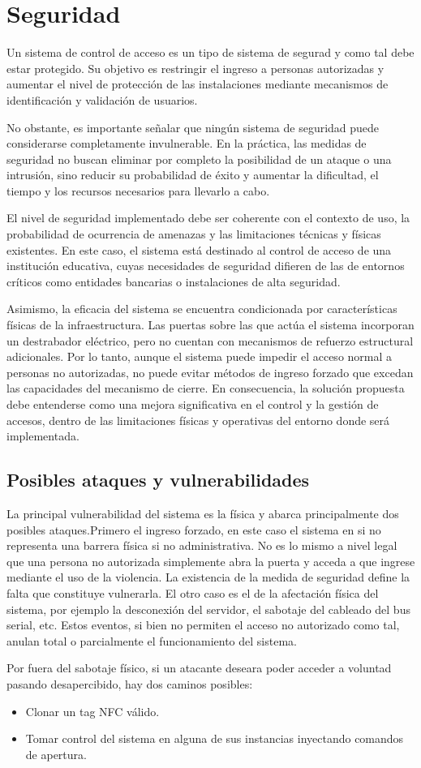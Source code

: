 \section{Seguridad} 

Un sistema de control de acceso es un tipo de sistema de segurad y como tal debe estar protegido.
Su objetivo es restringir el ingreso a personas autorizadas y aumentar el nivel de protección de las instalaciones mediante mecanismos de identificación y validación de usuarios.

No obstante, es importante señalar que ningún sistema de seguridad puede considerarse completamente invulnerable. En la práctica, las medidas de seguridad no buscan eliminar por completo la posibilidad de un ataque o una intrusión, sino reducir su probabilidad de éxito y aumentar la dificultad, el tiempo y los recursos necesarios para llevarlo a cabo.

El nivel de seguridad implementado debe ser coherente con el contexto de uso, la probabilidad de ocurrencia de amenazas y las limitaciones técnicas y físicas existentes. En este caso, el sistema está destinado al control de acceso de una institución educativa, cuyas necesidades de seguridad difieren de las de entornos críticos como entidades bancarias o instalaciones de alta seguridad.

Asimismo, la eficacia del sistema se encuentra condicionada por características físicas de la infraestructura. Las puertas sobre las que actúa el sistema incorporan un destrabador eléctrico, pero no cuentan con mecanismos de refuerzo estructural adicionales. Por lo tanto, aunque el sistema puede impedir el acceso normal a personas no autorizadas, no puede evitar métodos de ingreso forzado que excedan las capacidades del mecanismo de cierre. En consecuencia, la solución propuesta debe entenderse como una mejora significativa en el control y la gestión de accesos, dentro de las limitaciones físicas y operativas del entorno donde será implementada.

\subsection{Posibles ataques y vulnerabilidades}

La principal vulnerabilidad del sistema es la física y abarca principalmente dos posibles ataques.Primero el ingreso forzado, en este caso el sistema en si no representa una barrera física si no administrativa. No es lo mismo a nivel legal que una persona no autorizada simplemente abra la puerta y acceda a que ingrese mediante el uso de la violencia. La existencia de la medida de seguridad define la falta que constituye vulnerarla.
El otro caso es el de la afectación física del sistema, por ejemplo la desconexión del servidor, el sabotaje del cableado del bus serial, etc. Estos eventos, si bien no permiten el acceso no autorizado como tal, anulan total o parcialmente el funcionamiento del sistema.

Por fuera del sabotaje físico, si un atacante deseara poder acceder a voluntad pasando desapercibido, hay dos caminos posibles:

\begin{itemize}
    \item Clonar un tag NFC válido.
    \item Tomar control del sistema en alguna de sus instancias inyectando comandos de apertura.
\end{itemize}


